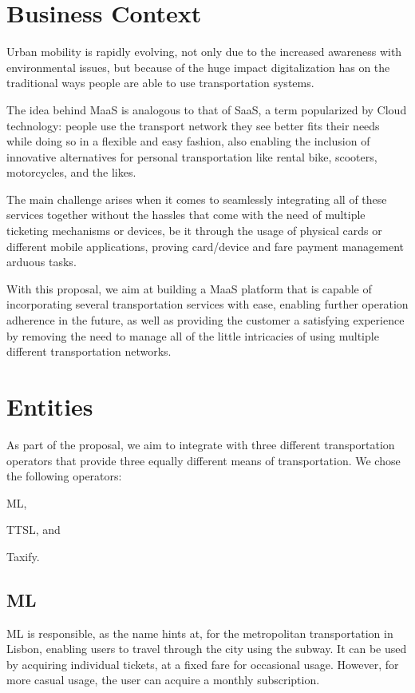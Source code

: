 \documentclass[runningheads,a4]{llncs}
\begin{document}
\maketitle

\section{Business Context}
\label{sec:context}
Urban mobility is rapidly evolving, not only due to the increased awareness with
environmental issues, but because of the huge impact digitalization has on the
traditional ways people are able to use transportation systems.

The idea behind \ac{MaaS} is analogous to that of \ac{SaaS}, a term popularized
by Cloud technology: people use the transport network they see better fits their
needs while doing so in a flexible and easy fashion, also enabling the inclusion
of innovative alternatives for personal transportation like rental bike,
scooters, motorcycles, and the likes.

The main challenge arises when it comes to seamlessly integrating all of these
services together without the hassles that come with the need of multiple
ticketing mechanisms or devices, be it through the usage of physical cards or
different mobile applications, proving card/device and fare payment management
arduous tasks.

With this proposal, we aim at building a \ac{MaaS} platform that is capable of
incorporating several transportation services with ease, enabling further
operation adherence in the future, as well as providing the customer a
satisfying experience by removing the need to manage all of the little
intricacies of using multiple different transportation networks.

\section{Entities}
\label{sec:entities}
As part of the proposal, we aim to integrate with three different transportation
operators that provide three equally different means of transportation. We chose
the following operators:
\begin{enumerate*}[label=(\arabic*)]
  \item \ac{ML},
  \item \ac{TTSL}, and
  \item Taxify.
\end{enumerate*}

\subsection{\acl{ML}}
\label{sec:entities.ml}
\acl{ML} is responsible, as the name hints at, for the metropolitan
transportation in Lisbon, enabling users to travel through the city using the
subway. It can be used by acquiring individual tickets, at a fixed fare for
occasional usage. However, for more casual usage, the user can acquire a
monthly subscription.
\end{document}
